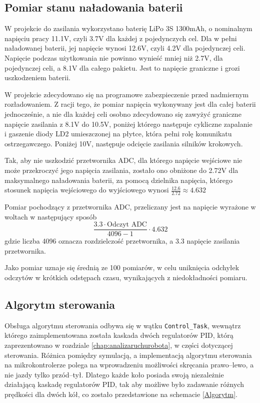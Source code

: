 \subsection{Pomiar stanu naładowania baterii}

W projekcie do zasilania wykorzystano baterię LiPo 3S 1300mAh, o nominalnym napięciu pracy 11.1V, czyli 3.7V dla każdej z pojedynczych cel. Dla w pełni naładowanej baterii, jej napięcie wynosi 12.6V, czyli 4.2V dla pojedynczej celi. Napięcie podczas użytkowania nie powinno wynieść mniej niż 2.7V, dla pojedynczej celi, a 8.1V dla całego pakietu. Jest to napięcie graniczne i grozi uszkodzeniem baterii.

W projekcie zdecydowano się na programowe zabezpieczenie przed nadmiernym rozładowaniem. Z racji tego, że pomiar napięcia wykonywany jest dla całej baterii jednocześnie, a nie dla każdej celi osobno zdecydowano się zawyżyć graniczne napięcie zasilania z 8.1V do 10.5V, poniżej którego następuje cykliczne zapalanie i gaszenie diody LD2 umieszczonej na płytce, która pełni rolę komunikatu ostrzegawczego. Poniżej 10V, następuje odcięcie zasilania silników krokowych.

Tak, aby nie uszkodzić przetwornika ADC, dla którego napięcie wejściowe nie może przekroczyć jego napięcia zasilania, zostało ono obniżone do 2.72V dla maksymalnego naładowania baterii, za pomocą dzielnika napięcia, którego stosunek napięcia wejściowego do wyjściowego wynosi $\frac{12.6}{2.72} \approx 4.632$

Pomiar pochodzący z przetwornika ADC, przeliczany jest na napięcie wyrażone w woltach w następujący sposób
$$
    \frac{3.3 \cdot \textrm{Odczyt ADC}}{4096 - 1} \cdot 4.632
$$
gdzie liczba 4096 oznacza rozdzielczość przetwornika, a 3.3 napięcie zasilania przetwornika.

Jako pomiar uznaje się średnią ze 100 pomiarów, w celu uniknięcia odchyłek odczytów w krótkich odstępach czasu, wynikających z niedokładności pomiaru.

\subsection{Algorytm sterowania}

Obsługa algorytmu sterowania odbywa się w wątku \texttt{Control\_Task}, wewnątrz którego zaimplementowana została kaskada dwóch regulatorów PID, którą zaprezentowano w rozdziale \ref{chap:analizaruchurobota}, w części dotyczącej sterowania. Różnica pomiędzy symulacją, a implementacją algorytmu sterowania na mikrokontrolerze polega na wprowadzeniu możliwości skręcania prawo--lewo, a nie jazdy tylko przód--tył. Dlatego każde koło posiada swoją niezależnie działającą kaskadę regulatorów PID, tak aby możliwe było zadawanie różnych prędkości dla dwóch kół, co zostało przedstawione na schemacie \ref{Algorytm}.

